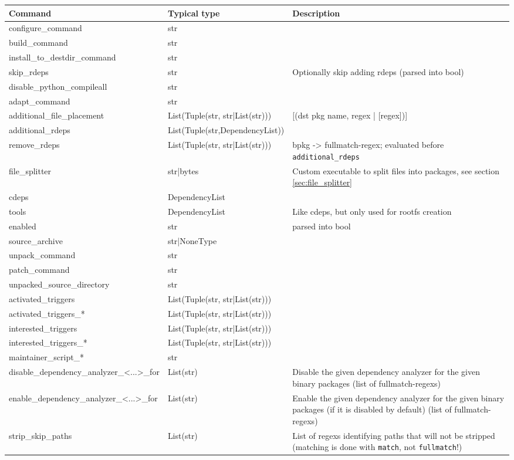 \documentclass[a4paper]{scrartcl}
\begin{document}
	\begin{tabularx}{\textwidth}{llX}
		Command & Typical type & Description \\
		\hline
		configure\_command & str & \\
		build\_command & str & \\
		install\_to\_destdir\_command & str & \\
		skip\_rdeps & str & Optionally skip adding rdeps (parsed into bool) \\
		disable\_python\_compileall & str & \\
		adapt\_command & str & \\
		additional\_file\_placement & List(Tuple(str, str|List(str))) & [(dst pkg name, regex | [regex])]\\

		additional\_rdeps & List(Tuple(str,DependencyList)) & \\
		remove\_rdeps & List(Tuple(str, str|List(str))) & bpkg -> fullmatch-regex; evaluated before \texttt{additional\_rdeps} \\
		file\_splitter & str|bytes & Custom executable to split files into packages, see section \ref{sec:file_splitter} \\
		
		cdeps & DependencyList & \\
		tools & DependencyList&  Like cdeps, but only used for rootfs creation \\
		enabled & str & parsed into bool \\
		source\_archive & str|NoneType & \\
		unpack\_command & str & \\
		patch\_command & str & \\
		unpacked\_source\_directory & str & \\
		activated\_triggers & List(Tuple(str, str|List(str))) & \\
		activated\_triggers\_* & List(Tuple(str, str|List(str))) & \\
		interested\_triggers & List(Tuple(str, str|List(str))) & \\
		interested\_triggers\_* & List(Tuple(str, str|List(str))) & \\
		maintainer\_script\_* & str & \\
		disable\_dependency\_analyzer\_<...>\_for & List(str) & Disable the given dependency analyzer for the given binary packages (list of fullmatch-regexs) \\
		enable\_dependency\_analyzer\_<...>\_for & List(str) & Enable the given dependency analyzer for the given binary packages (if it is disabled by default) (list of fullmatch-regexs) \\
		strip\_skip\_paths & List(str) & List of regexs identifying paths that will not be stripped (matching is done with \texttt{match}, not \texttt{fullmatch}!) \\
		

\end{tabularx}
\end{document}
